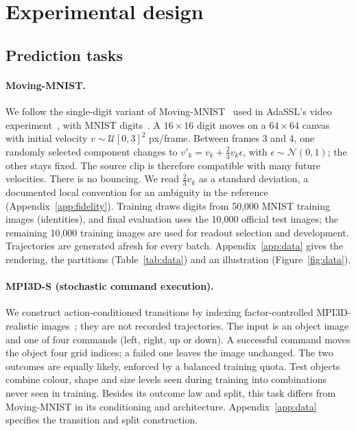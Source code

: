 \section{Experimental design}
\label{sec:design}

\subsection{Prediction tasks}
\label{sec:data-mm}
\label{sec:data-mpi3d}

\paragraph{Moving-MNIST.} We follow the single-digit variant of Moving-MNIST~\citep{srivastava2015unsupervised} used in AdaSSL's video experiment~\citep[App.~D.5]{zhang2026adassl}, with MNIST digits~\citep{lecun1998mnist}. A $16{\times}16$ digit moves on a $64{\times}64$ canvas with initial velocity $v\sim\mathcal U[0,3]^2$ px/frame. Between frames 3 and 4, one randomly selected component changes to $v'_k=v_k+\tfrac23v_k\epsilon$, with $\epsilon\sim\mathcal N(0,1)$; the other stays fixed. The source clip is therefore compatible with many future velocities. There is no bouncing. We read $\tfrac23v_k$ as a standard deviation, a documented local convention for an ambiguity in the reference (Appendix~\ref{app:fidelity}). Training draws digits from 50{,}000 MNIST training images (identities), and final evaluation uses the 10{,}000 official test images; the remaining 10{,}000 training images are used for readout selection and development. Trajectories are generated afresh for every batch. Appendix~\ref{app:data} gives the rendering, the partitions (Table~\ref{tab:data}) and an illustration (Figure~\ref{fig:data}).

\paragraph{MPI3D-S (stochastic command execution).} We construct action-conditioned transitions by indexing factor-controlled MPI3D-realistic images~\citep{gondal2019mpi3d}; they are not recorded trajectories. The input is an object image and one of four commands (left, right, up or down). A successful command moves the object four grid indices; a failed one leaves the image unchanged. The two outcomes are equally likely, enforced by a balanced training quota. Test objects combine colour, shape and size levels seen during training into combinations never seen in training. Besides its outcome law and split, this task differs from Moving-MNIST in its conditioning and architecture. Appendix~\ref{app:data} specifies the transition and split construction.

